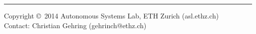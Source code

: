 \documentclass[10pt,landscape,a4paper]{article}
\begin{document}
\begin{multicols}{2}
\rule{0.3\linewidth}{0.25pt}
\scriptsize

Copyright \copyright\ 2014 Autonomous Systems Lab, ETH Zurich (asl.ethz.ch)\\
Contact: Christian Gehring (gehrinch@ethz.ch) \\

\end{multicols}
\end{document}
